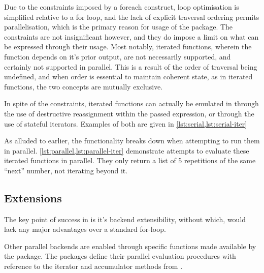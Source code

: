 Due to the constraints imposed by a foreach construct, loop optimisation
is simplified relative to a for loop, and the lack of explicit traversal
ordering permits parallelisation, which is the primary reason for usage
of the  package. The constraints are not insignificant
however, and they do impose a limit on what can be expressed through
their usage. Most notably, iterated functions, wherein the function
depends on it's prior output, are not necessarily supported, and
certainly not supported in parallel. This is a result of the order of
traversal being undefined, and when order is essential to maintain
coherent state, as in iterated functions, the two concepts are mutually
exclusive.

In spite of the constraints, iterated functions can actually be emulated
in  through the use of destructive reassignment within the passed
expression, or through the use of stateful iterators. Examples of both
are given in \cref{lst:serial,lst:serial-iter}



As alluded to earlier, the functionality breaks down when attempting to
run them in parallel. \cref{lst:parallel,lst:parallel-iter}
demonstrate attempts to evaluate these iterated functions in parallel.
They only return a list of 5 repetitions of the same ``next'' number,
not iterating beyond it.



\subsection{Extensions}\label{subsec:foreach-extensions}

The key point of success in  is it's backend extensibility,
without which,  would lack any major advantages over a standard
for-loop.

Other parallel backends are enabled through specific functions made
available by the  package. The packages define their parallel
evaluation procedures with reference to the iterator and accumulator
methods from .

